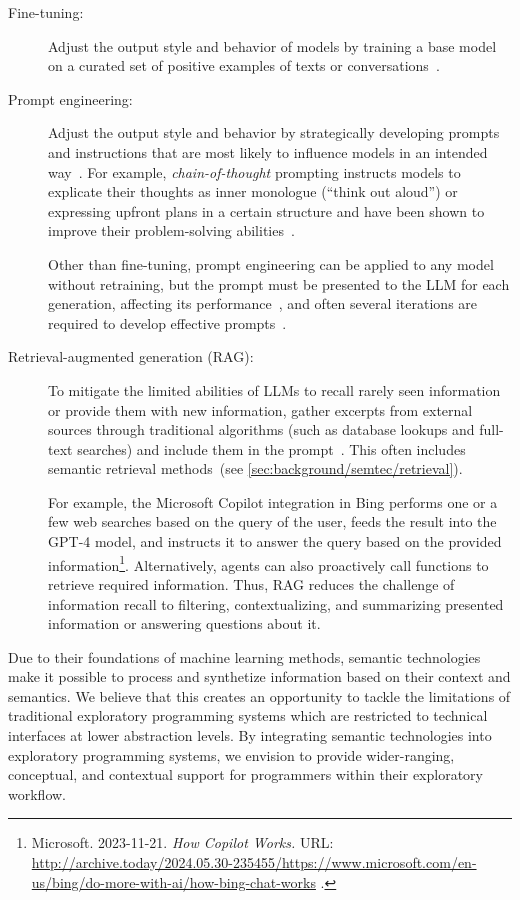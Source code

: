 \begin{description}
	\item[Fine-tuning:] Adjust the output style and behavior of models by training a base model on a curated set of positive examples of texts or conversations~\cite{kojima2022large,wei2022finetuned}.

	\item[Prompt engineering:] Adjust the output style and behavior by strategically developing prompts and instructions that are most likely to influence models in an intended way~\cite{white2023prompt}.
	For example, \emph{chain-of-thought} prompting instructs models to explicate their thoughts as inner monologue (``think out aloud'') or expressing upfront plans in a certain structure and have been shown to improve their problem-solving abilities~\cite{wei2023chainofthought}.

	Other than fine-tuning, prompt engineering can be applied to any model without retraining, but the prompt must be presented to the LLM for each generation, affecting its performance~\cite{zhao2023survey}, and often several iterations are required to develop effective prompts~\cite{white2023prompt}.

	\item[Retrieval-augmented generation (RAG):] To mitigate the limited abilities of LLMs to recall rarely seen information or provide them with new information, gather excerpts from external sources through traditional algorithms (such as database lookups and full-text searches) and include them in the prompt~\cite{lewis2020retrieval}.
	This often includes semantic retrieval methods~(see \cref{sec:background/semtec/retrieval}).

	For example, the Microsoft Copilot integration in Bing performs one or a few web searches based on the query of the user, feeds the result into the GPT-4 model, and instructs it to answer the query based on the provided information\footnote{
		Microsoft. 2023-11-21. \emph{How Copilot Works.}
		URL:
		\url{http://archive.today/2024.05.30-235455/https://www.microsoft.com/en-us/bing/do-more-with-ai/how-bing-chat-works}%
		.
	}.
	Alternatively, agents can also proactively call functions to retrieve required information.
	Thus, RAG reduces the challenge of information recall to filtering, contextualizing, and summarizing presented information or answering questions about it.
\end{description}

\ParSep

Due to their foundations of machine learning methods, semantic technologies make it possible to process and synthetize information based on their context and semantics.
We believe that this creates an opportunity to tackle the limitations of traditional exploratory programming systems which are restricted to technical interfaces at lower abstraction levels.
By integrating semantic technologies into exploratory programming systems, we envision to provide wider-ranging, conceptual, and contextual support for programmers within their exploratory workflow.
